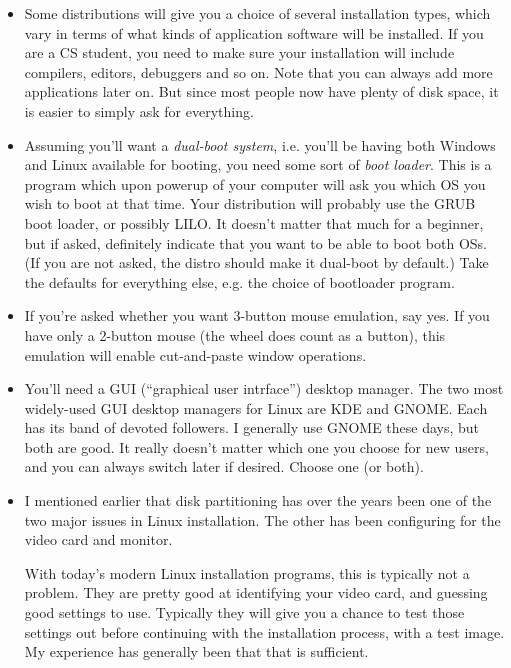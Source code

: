 \documentclass[11pt]{article}
\begin{document}
\begin{itemize}

\item Some distributions will give you a choice of several installation
types, which vary in terms of what kinds of application software will be
installed.  If you are a CS student, you need to make sure your
installation will include compilers, editors, debuggers and so on.  Note
that you can always add more applications later on.  But since most
people now have plenty of disk space, it is easier to simply ask for
everything.  

\item Assuming you'll want a {\it dual-boot system}, i.e. you'll be
having both Windows and Linux available for booting, you need some sort
of {\it boot loader}.  This is a program which upon powerup of your
computer will ask you which OS you wish to boot at that time.  Your
distribution will probably use the GRUB boot loader, or possibly LILO.
It doesn't matter that much for a beginner, but if asked, definitely
indicate that you want to be able to boot both OSs.  (If you are not
asked, the distro should make it dual-boot by default.)  Take the
defaults for everything else, e.g. the choice of bootloader program. 

\item If you're asked whether you want 3-button mouse emulation, say
yes.  If you have only a 2-button mouse (the wheel does count as a
button), this emulation will enable cut-and-paste window operations.

\item You'll need a GUI (``graphical user intrface'') desktop manager.
The two most widely-used GUI desktop managers for Linux are KDE and
GNOME.  Each has its band of devoted followers.  I generally use GNOME
these days, but both are good.  It really doesn't matter which one you
choose for new users, and you can always switch later if desired.
Choose one (or both).

\item I mentioned earlier that disk partitioning has over the years been
one of the two major issues in Linux installation.  The other has been
configuring for the video card and monitor.

With today's modern Linux installation programs, this is typically not a
problem.  They are pretty good at identifying your video card, and
guessing good settings to use.  Typically they will give you a chance to
test those settings out before continuing with the installation process,
with a test image.  My experience has generally been that that is
sufficient.


\end{itemize}
\end{document}
